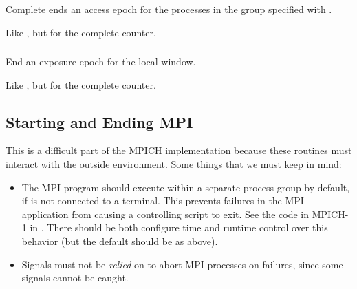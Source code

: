 \documentclass{article}
\begin{document}

\subsubsection{}
Complete ends an access epoch for the processes in the group specified with
.

Like , but for the complete counter.

\subsubsection{}
End an exposure epoch for the local window.

Like , but for the complete counter.



\subsection{Starting and Ending MPI}
\label{sec:init}

This is a difficult part of the MPICH implementation because these routines
must interact with the outside environment.  Some things that we must keep in
mind:
\begin{itemize}
\item The MPI program should execute within a separate process group by
  default, if  is not connected to a terminal.  This prevents
  failures in the MPI application from causing a controlling script to exit.
  See the code in MPICH-1 in .  There should be 
  both configure time and runtime control over this behavior (but the default
  should be as above).

\item Signals must not be \emph{relied} on to abort MPI processes on failures,
  since some signals cannot be caught.

\end{itemize}
\end{document}
